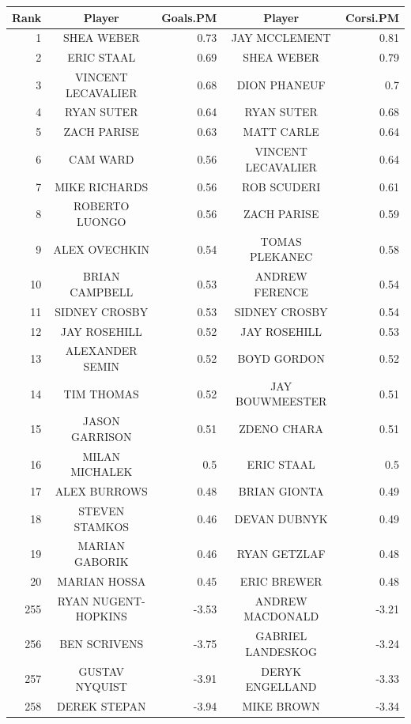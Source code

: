 \begin{table}[p]
	\centering\small
	\begin{tabular}{r c r | c r  }
		Rank & Player & Goals.PM  & Player & Corsi.PM  \\ 
		\hline\rule{0pt}{4ex} 
		1     & SHEA WEBER & 0.73  & JAY MCCLEMENT & 0.81 \\
		2     & ERIC STAAL & 0.69  & SHEA WEBER & 0.79 \\
		3     & VINCENT LECAVALIER & 0.68  & DION PHANEUF & 0.7 \\
		4     & RYAN SUTER & 0.64  & RYAN SUTER & 0.68 \\
		5     & ZACH PARISE & 0.63  & MATT CARLE & 0.64 \\
		6     & CAM WARD & 0.56  & VINCENT LECAVALIER & 0.64 \\
		7     & MIKE RICHARDS & 0.56  & ROB SCUDERI & 0.61 \\
		8     & ROBERTO LUONGO & 0.56  & ZACH PARISE & 0.59 \\
		9     & ALEX OVECHKIN & 0.54  & TOMAS PLEKANEC & 0.58 \\
		10    & BRIAN CAMPBELL & 0.53  & ANDREW FERENCE & 0.54 \\
		11    & SIDNEY CROSBY & 0.53  & SIDNEY CROSBY & 0.54 \\
		12    & JAY ROSEHILL & 0.52  & JAY ROSEHILL & 0.53 \\
		13    & ALEXANDER SEMIN & 0.52  & BOYD GORDON & 0.52 \\
		14    & TIM THOMAS & 0.52  & JAY BOUWMEESTER & 0.51 \\
		15    & JASON GARRISON & 0.51  & ZDENO CHARA & 0.51 \\
		16    & MILAN MICHALEK & 0.5   & ERIC STAAL & 0.5 \\
		17    & ALEX BURROWS & 0.48  & BRIAN GIONTA & 0.49 \\
		18    & STEVEN STAMKOS & 0.46  & DEVAN DUBNYK & 0.49 \\
		19    & MARIAN GABORIK & 0.46  & RYAN GETZLAF & 0.48 \\
		20    & MARIAN HOSSA & 0.45  & ERIC BREWER & 0.48 \\
		255   & RYAN NUGENT-HOPKINS & -3.53 & ANDREW MACDONALD & -3.21 \\
		256   & BEN SCRIVENS & -3.75 & GABRIEL LANDESKOG & -3.24 \\
		257   & GUSTAV NYQUIST & -3.91 & DERYK ENGELLAND & -3.33 \\
		258   & DEREK STEPAN & -3.94 & MIKE BROWN & -3.34 \\

\end{tabular}
\end{table}
